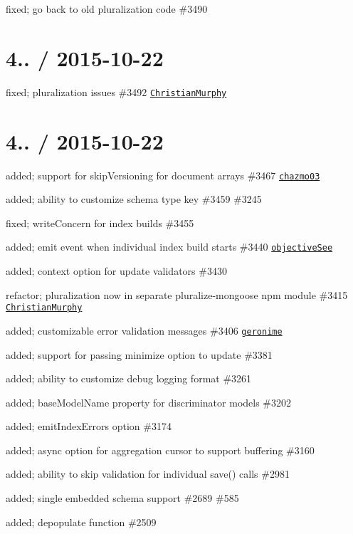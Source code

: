 \begin{DoxyItemize}
\item fixed; go back to old pluralization code \#3490
\end{DoxyItemize}

\section*{4.. / 2015-\/10-\/22 }


\begin{DoxyItemize}
\item fixed; pluralization issues \#3492 \href{https://github.com/ChristianMurphy}{\tt Christian\+Murphy}
\end{DoxyItemize}

\section*{4.. / 2015-\/10-\/22 }


\begin{DoxyItemize}
\item added; support for skip\+Versioning for document arrays \#3467 \href{https://github.com/chazmo03}{\tt chazmo03}
\item added; ability to customize schema \textquotesingle{}type\textquotesingle{} key \#3459 \#3245
\item fixed; write\+Concern for index builds \#3455
\item added; emit event when individual index build starts \#3440 \href{https://github.com/objectiveSee}{\tt objective\+See}
\item added; \textquotesingle{}context\textquotesingle{} option for update validators \#3430
\item refactor; pluralization now in separate pluralize-\/mongoose npm module \#3415 \href{https://github.com/ChristianMurphy}{\tt Christian\+Murphy}
\item added; customizable error validation messages \#3406 \href{https://github.com/geronime}{\tt geronime}
\item added; support for passing \textquotesingle{}minimize\textquotesingle{} option to update \#3381
\item added; ability to customize debug logging format \#3261
\item added; base\+Model\+Name property for discriminator models \#3202
\item added; \textquotesingle{}emit\+Index\+Errors\textquotesingle{} option \#3174
\item added; \textquotesingle{}async\textquotesingle{} option for aggregation cursor to support buffering \#3160
\item added; ability to skip validation for individual save() calls \#2981
\item added; single embedded schema support \#2689 \#585
\item added; depopulate function \#2509
\end{DoxyItemize}

